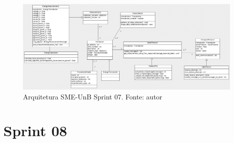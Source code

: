 \begin{figure}[!htpb]
    \centering
    \includegraphics[scale=0.4,angle=90]{figuras/sprint07arq.eps}
    \caption{Arquitetura SME-UnB Sprint 07. Fonte: autor}
    \label{sprint07arq}
\end{figure}

\section{Sprint 08}
